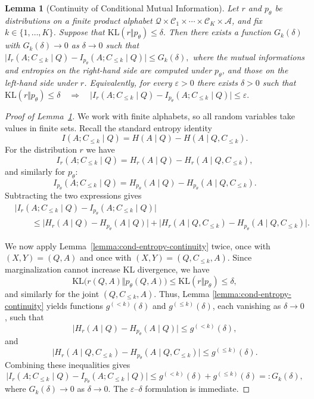 \documentclass[10pt,a4paper]{amsart}
\newtheorem{lemma}{Lemma}
\begin{document}
\begin{lemma}[Continuity of Conditional Mutual Information]\label{lemma:mi-continuity}
Let $r$ and $p_\theta$ be distributions on a finite product alphabet
$\mathcal{Q}\times\mathcal{C}_1\times\cdots\times\mathcal{C}_K
\times\mathcal{A}$, and fix $k\in\{1,\dots,K\}$. Suppose that $\mathrm{KL}(r \Vert p_\theta) \le \delta.$ Then there exists a function $G_k(\delta)$ with $G_k(\delta)\to 0$ as
$\delta\to 0$ such that $\bigl|
I_r(A; C_{\le k} \mid Q)
-
I_{p_\theta}(A; C_{\le k} \mid Q)
\bigr|
\le G_k(\delta),$ where the mutual informations and entropies on the right-hand side are computed under $p_\theta$, and those on the left-hand side under $r$. Equivalently, for every $\varepsilon>0$ there exists $\delta>0$ such
that $\mathrm{KL}(r \Vert p_\theta) \le \delta
\quad\Longrightarrow\quad
\bigl|
I_r(A; C_{\le k} \mid Q)
-
I_{p_\theta}(A; C_{\le k} \mid Q)
\bigr|
\le \varepsilon.$
\end{lemma}

\begin{proof}[Proof of Lemma~\ref{lemma:mi-continuity}]
We work with finite alphabets, so all random variables take values in finite sets. Recall the standard entropy identity
\[
I(A; C_{\le k} \mid Q)
=
H(A \mid Q)
-
H(A \mid Q, C_{\le k}).
\]
For the distribution $r$ we have
\[
I_r(A; C_{\le k} \mid Q)
=
H_r(A \mid Q)
-
H_r(A \mid Q, C_{\le k}),
\]
and similarly for $p_\theta$:
\[
I_{p_\theta}(A; C_{\le k} \mid Q)
=
H_{p_\theta}(A \mid Q)
-
H_{p_\theta}(A \mid Q, C_{\le k}).
\]
Subtracting the two expressions gives
\begin{align*}
&\bigl|
I_r(A; C_{\le k} \mid Q)
-
I_{p_\theta}(A; C_{\le k} \mid Q)
\bigr| \\
&\qquad\le
\bigl|
H_r(A \mid Q)
-
H_{p_\theta}(A \mid Q)
\bigr|
+
\bigl|
H_r(A \mid Q, C_{\le k})
-
H_{p_\theta}(A \mid Q, C_{\le k})
\bigr|.
\end{align*}

We now apply Lemma~\ref{lemma:cond-entropy-continuity} twice, once
with $(X,Y) = (Q,A)$ and once with $(X,Y) = (Q,C_{\le k},A)$. Since marginalization cannot increase KL divergence, we have
\[
\mathrm{KL}\bigl(r(Q,A)
\Vert
p_\theta(Q,A)
\bigr)
\le \mathrm{KL}(r\Vert p_\theta)
\le \delta,
\]
and similarly for the joint $(Q,C_{\le k},A)$. Thus, Lemma
\ref{lemma:cond-entropy-continuity} yields functions
$g^{(<k)}(\delta)$ and $g^{(\le k)}(\delta)$, each vanishing as
$\delta\to 0$, such that
\[
\bigl|
H_r(A \mid Q)
-
H_{p_\theta}(A \mid Q)
\bigr|
\le g^{(<k)}(\delta),
\]
and
\[
\bigl|
H_r(A \mid Q, C_{\le k})
-
H_{p_\theta}(A \mid Q, C_{\le k})
\bigr|
\le g^{(\le k)}(\delta).
\]
Combining these inequalities gives
\[
\bigl|
I_r(A; C_{\le k} \mid Q)
-
I_{p_\theta}(A; C_{\le k} \mid Q)
\bigr|
\le
g^{(<k)}(\delta) + g^{(\le k)}(\delta)
=: G_k(\delta),
\]
where $G_k(\delta)\to 0$ as $\delta\to 0$. The
$\varepsilon$--$\delta$ formulation is immediate.
\end{proof}
\end{document}
